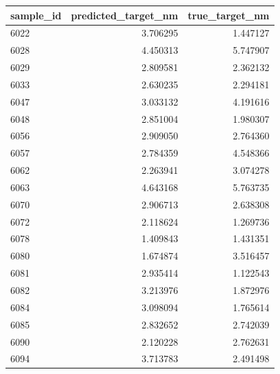 \begin{tabular}{lrr}
\toprule
sample_id & predicted_target_nm & true_target_nm \\
\midrule
6022 & 3.706295 & 1.447127 \\
6028 & 4.450313 & 5.747907 \\
6029 & 2.809581 & 2.362132 \\
6033 & 2.630235 & 2.294181 \\
6047 & 3.033132 & 4.191616 \\
6048 & 2.851004 & 1.980307 \\
6056 & 2.909050 & 2.764360 \\
6057 & 2.784359 & 4.548366 \\
6062 & 2.263941 & 3.074278 \\
6063 & 4.643168 & 5.763735 \\
6070 & 2.906713 & 2.638308 \\
6072 & 2.118624 & 1.269736 \\
6078 & 1.409843 & 1.431351 \\
6080 & 1.674874 & 3.516457 \\
6081 & 2.935414 & 1.122543 \\
6082 & 3.213976 & 1.872976 \\
6084 & 3.098094 & 1.765614 \\
6085 & 2.832652 & 2.742039 \\
6090 & 2.120228 & 2.762631 \\
6094 & 3.713783 & 2.491498 \\
\bottomrule
\end{tabular}
